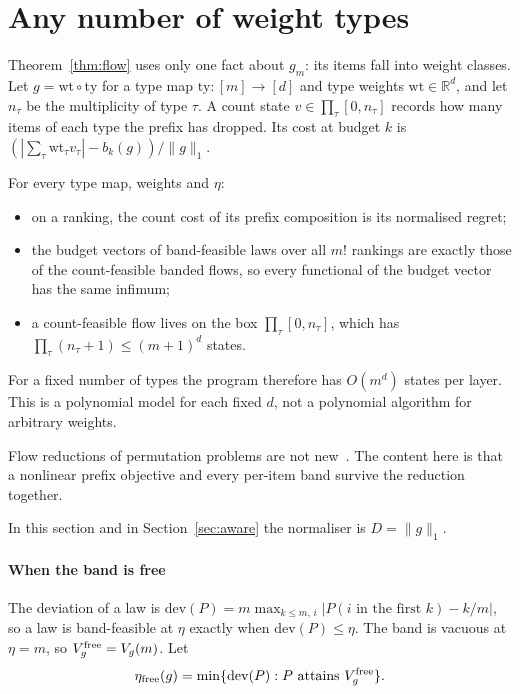 \section{Any number of weight types}
\label{sec:typed}

Theorem~\ref{thm:flow} uses only one fact about $g_m$: its items fall into weight classes. Let
$g=\mathrm{wt}\circ\mathrm{ty}$ for a type map $\mathrm{ty}:[m]\to[d]$ and type weights
$\mathrm{wt}\in\mathbb R^d$, and let $n_\tau$ be the multiplicity of type $\tau$. A count state
$v\in\prod_\tau[0,n_\tau]$ records how many items of each type the prefix has dropped. Its cost
at budget $k$ is $(|\sum_\tau\mathrm{wt}_\tau v_\tau|-b_k(g))/\|g\|_1$.

\begin{theorem}
\label{thm:typedflow}
For every type map, weights and $\eta$:
\begin{itemize}
\item on a ranking, the count cost of its prefix composition is its normalised regret;
\item the budget vectors of band-feasible laws over all $m!$ rankings are exactly those of the
count-feasible banded flows, so every functional of the budget vector has the same infimum;
\item a count-feasible flow lives on the box $\prod_\tau[0,n_\tau]$, which has
$\prod_\tau(n_\tau+1)\le(m+1)^d$ states.
\end{itemize}
For a fixed number of types the program therefore has $O(m^d)$ states per layer. This is a
polynomial model for each fixed $d$, not a polynomial algorithm for arbitrary weights.
\end{theorem}

Flow reductions of permutation problems are not new~\cite{schrijver2003}. The content here is
that a nonlinear prefix objective and every per-item band survive the reduction together.

In this section and in Section~\ref{sec:aware} the normaliser is $D=\|g\|_1$.

\paragraph{When the band is free} The deviation of a law is
$\mathrm{dev}(P)=m\max_{k\le m,\,i}|P(i\text{ in the first }k)-k/m|$, so a law is band-feasible
at $\eta$ exactly when $\mathrm{dev}(P)\le\eta$. The band is vacuous at $\eta=m$, so
$V^{\rm free}_g=V_g(m)$. Let
\[
\eta_{\rm free}(g)=\min\{\mathrm{dev}(P):P\ \text{attains}\ V^{\rm free}_g\}.
\]

